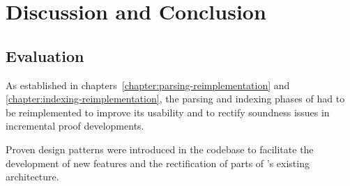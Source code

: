 \chapter{Discussion and Conclusion}


\section{Evaluation}

As established in chapters~\ref{chapter:parsing-reimplementation} and \ref{chapter:indexing-reimplementation}, the parsing and indexing phases of \Beluga had to be reimplemented to improve its usability and to rectify soundness issues in incremental proof developments.

Proven design patterns were introduced in the codebase to facilitate the development of new features and the rectification of parts of \Beluga's existing architecture.








